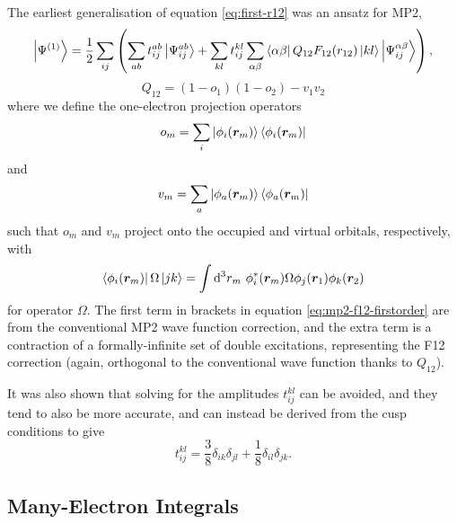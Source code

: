 The earliest generalisation of equation \ref{eq:first-r12} was an ansatz for MP2,\supercite{klopperMollerplesset1987,kutzelniggWave1991,klopperOrbitalinvariant1991,tewOpenshell2010,bokhanImplementation2008}
\begin{equation}
    \label{eq:mp2-f12-firstorder}
    \ket{\Psi^{(1)}} = \frac 12\sum_{ij}\left( \sum_{ab}t_{ij}^{ab}\ket{\Psi_{ij}^{ab}} + \sum_{kl}t_{ij}^{kl}\sum_{\alpha\beta}\bra{\alpha\beta}Q_{12}F_{12}(r_{12})\ket{kl}\ket{\Psi_{ij}^{\alpha\beta}} \right),
\end{equation}
\begin{equation}
    \label{eq:mp2-f12-projector}
    Q_{12} = (1-o_1)(1-o_2) - v_1v_2
\end{equation}
where we define the one-electron projection operators
\begin{equation}
    o_m = \sum_i\ket{\phi_i(\bm r_m)}\bra{\phi_i(\bm r_m)}
\end{equation}
and
\begin{equation}
    v_m = \sum_a\ket{\phi_a(\bm r_m)}\bra{\phi_a(\bm r_m)}
\end{equation}
such that $o_m$ and $v_m$ project onto the occupied and virtual orbitals, respectively, with
\begin{equation}
    \bra{\phi_i(\bm r_m)}\Omega\ket{jk} = \int\mathrm{d}^3r_m\ \phi_i^*(\bm r_m)\Omega\phi_j(\bm r_1)\phi_k(\bm r_2)
\end{equation}
for operator $\Omega$. The first term in brackets in equation \ref{eq:mp2-f12-firstorder} are from the conventional MP2 wave function correction, and the extra term is a contraction of a formally-infinite set of double excitations, representing the F12 correction (again, orthogonal to the conventional wave function thanks to $Q_{12}$).

It was also shown that solving for the amplitudes $t_{ij}^{kl}$ can be avoided,\supercite{ten-noNew2007,tewComparison2006,wernerGeneral2007,klopperExplicitly2002,petersonBenchmark1994} and they tend to also be more accurate, and can instead be derived from the cusp conditions to give
\begin{equation}
    t_{ij}^{kl} = \frac 38\delta_{ik}\delta_{jl}+\frac 18\delta_{il}\delta_{jk}.
\end{equation}

\subsection{Many-Electron Integrals}

